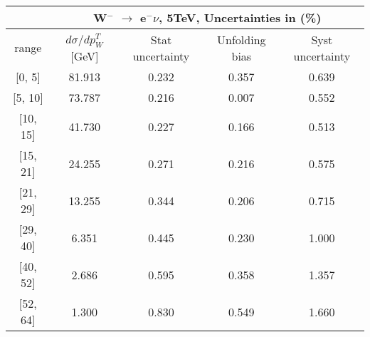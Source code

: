 \documentclass[12pt]{article}
\begin{document}
 
\begin{table}[] 
\begin{tabular}{c|c|c|c|c|}
\cline{2-5}
& \multicolumn{4}{c|}{W$^{-}$ $\rightarrow$ e$^{-} \nu $, 5TeV, Uncertainties in (\%)}  \\ \hline \hline 
\multicolumn{1}{|c|}{  range } & $d\sigma$/$dp^{T}_{W}$ [GeV]     & Stat uncertainty     & Unfolding bias     & Syst uncertainty        \\ \hline \hline 
\multicolumn{1}{|c|}{{[}0,  5{]}}  & 81.913 & 0.232 & 0.357 & 0.639 \\ \hline 
\multicolumn{1}{|c|}{{[}5,  10{]}}  & 73.787 & 0.216 & 0.007 & 0.552 \\ \hline 
\multicolumn{1}{|c|}{{[}10,  15{]}}  & 41.730 & 0.227 & 0.166 & 0.513 \\ \hline 
\multicolumn{1}{|c|}{{[}15,  21{]}}  & 24.255 & 0.271 & 0.216 & 0.575 \\ \hline 
\multicolumn{1}{|c|}{{[}21,  29{]}}  & 13.255 & 0.344 & 0.206 & 0.715 \\ \hline 
\multicolumn{1}{|c|}{{[}29,  40{]}}  & 6.351 & 0.445 & 0.230 & 1.000 \\ \hline 
\multicolumn{1}{|c|}{{[}40,  52{]}}  & 2.686 & 0.595 & 0.358 & 1.357 \\ \hline 
\multicolumn{1}{|c|}{{[}52,  64{]}}  & 1.300 & 0.830 & 0.549 & 1.660 \\ \hline 
\end{tabular}
\end{table}
\end{document}

